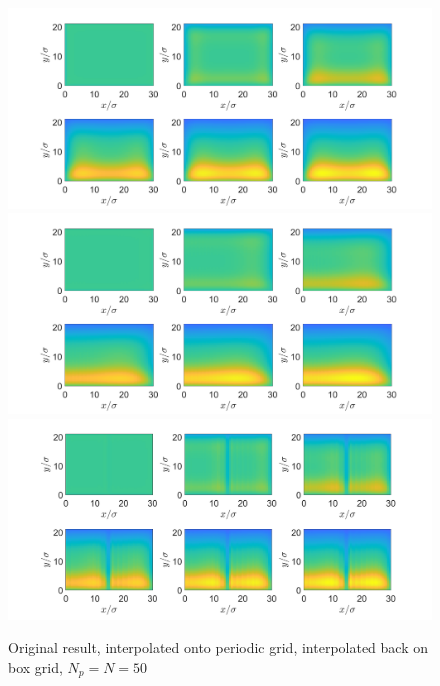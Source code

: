 \documentclass[11pt, a4paper]{article}
\theoremstyle{definition}
\begin{document}
	\begin{figure}[h]
		\centering
		\includegraphics[scale=0.3]{Original.png}
		\includegraphics[scale=0.3]{Periodic.png}
		\includegraphics[scale=0.3]{Interpolated.png}
		\caption{Original result, interpolated onto periodic grid, interpolated back on box grid, $N_p = N = 50$} 
		\label{F2}
	\end{figure}
\end{document}
